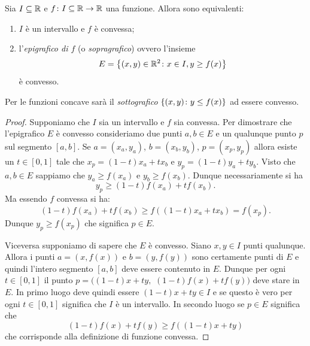 \begin{theorem}
Sia $I\subseteq {\mathbb R}$ e $f\colon I\subseteq {\mathbb R}\to {\mathbb R}$ una funzione.
Allora sono equivalenti:
\begin{enumerate}
\item $I$ è un intervallo e $f$ è convessa;
\item l'\emph{epigrafico di $f$}%
%
%
(o \emph{sopragrafico})
%
ovvero l'insieme
\[
  E = {\left\{ (x,y)\in {\mathbb R}^2\colon x\in I, y\ge f(x) \right\}}
\]
è convesso.
\end{enumerate}

Per le funzioni concave sarà il \emph{sottografico} ${\left\{ (x,y)\colon y\le f(x) \right\}}$ ad essere convesso.
\end{theorem}
%
\begin{proof}
Supponiamo che $I$ sia un intervallo e $f$ sia convessa. 
Per dimostrare che l'epigrafico $E$ è convesso consideriamo due punti $a,b\in E$ 
e un qualunque punto $p$ sul segmento $[a,b]$.
Se $a=(x_a, y_a)$, $b=(x_b,y_b)$, $p=(x_p, y_p)$
allora esiste un $t\in [0,1]$ tale che $x_p = (1-t)x_a + t x_b$ e $y_p=(1-t)y_a + t y_b$.
Visto che $a,b\in E$ sappiamo che $y_a \ge f(x_a)$ e $y_b\ge f(x_b)$. 
Dunque necessariamente si ha
\[
  y_p \ge (1-t)f(x_a) + t f(x_b).
\]
Ma essendo $f$ convessa si ha:
\[
  (1-t)f(x_a) + t f(x_b) \ge f((1-t)x_a + t x_b) = f(x_p).
\]
Dunque $y_p\ge f(x_p)$ che significa $p\in E$.

Viceversa supponiamo di sapere che $E$ è convesso. Siano $x,y\in I$ punti qualunque. Allora i punti $a=(x,f(x))$ e $b=(y,f(y))$ sono certamente punti di $E$ e quindi l'intero segmento $[a,b]$ deve essere contenuto in $E$. Dunque per ogni $t\in [0,1]$ il punto $p = ((1-t)x + t y,$ $(1-t)f(x)+ tf(y))$ deve stare in $E$. In primo luogo deve quindi essere $(1-t)x+ty\in I$ e se questo è vero per ogni $t\in[0,1]$ significa che $I$ è un intervallo. In secondo luogo se $p\in E$ significa che
\[
  (1-t)f(x) +t f(y) \ge f((1-t)x + t y)
\]
che corrisponde alla definizione di funzione convessa.
\end{proof}


